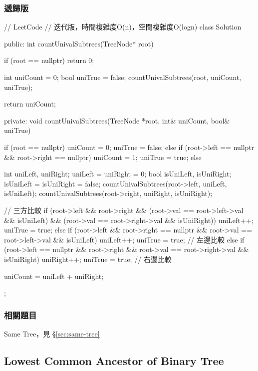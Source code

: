 \subsubsection{遞歸版}
\begin{Code}
// LeetCode
// 迭代版，時間複雜度O(n)，空間複雜度O(logn)
class Solution {
public:
    int countUnivalSubtrees(TreeNode* root) {
        if (root == nullptr) return 0;

        int uniCount = 0;
        bool uniTrue = false;
        countUnivalSubtrees(root, uniCount, uniTrue);

        return uniCount;
    }
private:
    void countUnivalSubtrees(TreeNode *root, int& uniCount, bool& uniTrue) {
        if (root == nullptr) {
            uniCount = 0;
            uniTrue = false;
        }
        else if (root->left == nullptr && root->right == nullptr) {
            uniCount = 1;
            uniTrue = true;
        }
        else {
            int uniLeft, uniRight; uniLeft = uniRight = 0;
            bool isUniLeft, isUniRight; isUniLeft = isUniRight = false;
            countUnivalSubtrees(root->left, uniLeft, isUniLeft);
            countUnivalSubtrees(root->right, uniRight, isUniRight);

            // 三方比較
            if (root->left && root->right
               && (root->val == root->left->val && isUniLeft)
               && (root->val == root->right->val && isUniRight)) {
                uniLeft++;
                uniTrue = true;
            }
            else if (root->left && root->right == nullptr
                     && root->val == root->left->val && isUniLeft)
            { uniLeft++; uniTrue = true; } // 左邊比較
            else if (root->left == nullptr && root->right
                     && root->val == root->right->val && isUniRight)
            { uniRight++; uniTrue = true; } // 右邊比較

            uniCount = uniLeft + uniRight;
        }
    }
};
\end{Code}


\subsubsection{相關題目}
\begindot
\item Same Tree，見 \S \ref{sec:same-tree}
\myenddot

\subsection{Lowest Common Ancestor of Binary Tree}
\label{sec:lowest-common-ancestor-of-binary-tree}


